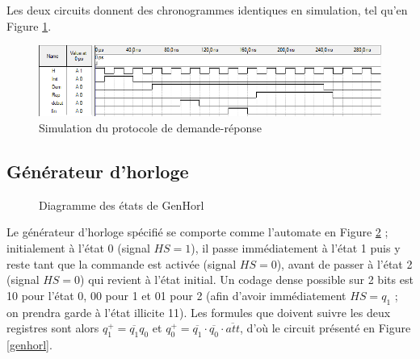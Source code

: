 \documentclass[a4paper,11pt]{article}
\begin{document}
Les deux circuits donnent des chronogrammes identiques en simulation, tel qu'en Figure \ref{simdemrep}.

\begin{figure}[h]
\center
\includegraphics[scale=0.6]{simdemrep.png}
\caption{Simulation du protocole de demande-réponse}
\label{simdemrep}
\end{figure}


\subsection*{Générateur d'horloge}

\begin{figure}[h]
\center
{}
\caption{Diagramme des états de GenHorl}
\label{autogenh}
\end{figure}

Le générateur d'horloge spécifié se comporte comme l'automate en Figure \ref{autogenh} ; initialement à l'état 0 (signal $HS = 1$), il passe immédiatement à l'état 1 puis y reste tant que la commande est activée (signal $HS = 0$), avant de passer à l'état 2 (signal $HS = 0$) qui revient à l'état initial. Un codage dense possible sur 2 bits est 10 pour l'état 0, 00 pour 1 et 01 pour 2 (afin d'avoir immédiatement $HS=q_1$ ; on prendra garde à l'état illicite 11). Les formules que doivent suivre les deux registres sont alors $q_1^+=\overline{q_1}q_0$ et $q_0^+=\overline{q_1}\cdot\overline{q_0}\cdot\overline{att}$, d'où le circuit présenté en Figure \ref{genhorl}.
\end{document}
